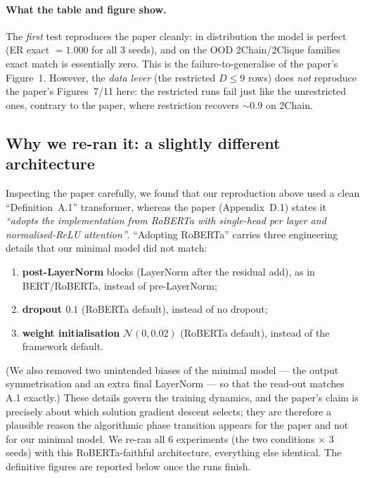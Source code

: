 \documentclass[11pt,a4paper]{article}
\begin{document}
\paragraph{What the table and figure show.} The \emph{first} test reproduces the
paper cleanly: in distribution the model is perfect (ER exact $= 1.000$ for all
$3$ seeds), and on the OOD 2Chain/2Clique families exact match is essentially
zero. This is the failure-to-generalise of the paper's Figure~1. However, the
\emph{data lever} (the restricted $D \le 9$ rows) does \emph{not} reproduce the
paper's Figures~7/11 here: the restricted runs fail just like the unrestricted
ones, contrary to the paper, where restriction recovers $\sim 0.9$ on 2Chain.

\subsection{Why we re-ran it: a slightly different architecture}

Inspecting the paper carefully, we found that our reproduction above used a
clean ``Definition~A.1'' transformer, whereas the paper (Appendix~D.1) states it
\emph{``adopts the implementation from RoBERTa with single-head per layer and
normalised-ReLU attention''}. ``Adopting RoBERTa'' carries three engineering
details that our minimal model did not match:
\begin{enumerate}
    \item \textbf{post-LayerNorm} blocks (LayerNorm after the residual add), as
          in BERT/RoBERTa, instead of pre-LayerNorm;
    \item \textbf{dropout $0.1$} (RoBERTa default), instead of no dropout;
    \item \textbf{weight initialisation} $\mathcal{N}(0, 0.02)$ (RoBERTa
          default), instead of the framework default.
\end{enumerate}
(We also removed two unintended biases of the minimal model --- the output
symmetrisation and an extra final LayerNorm --- so that the read-out matches
A.1 exactly.) These details govern the training dynamics, and the paper's claim
is precisely about which solution gradient descent selects; they are therefore a
plausible reason the algorithmic phase transition appears for the paper and not
for our minimal model. We re-ran all $6$ experiments (the two conditions
$\times$ $3$ seeds) with this RoBERTa-faithful architecture, everything else
identical. The definitive figures are reported below once the runs finish.
\end{document}
